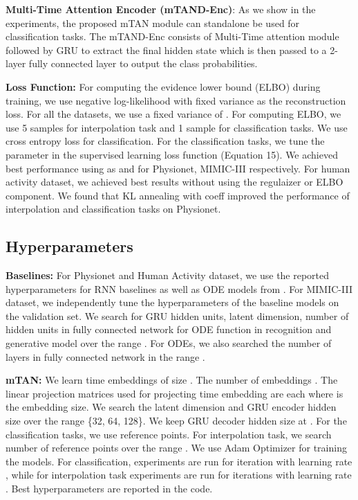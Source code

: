 \documentclass{article} \usepackage{iclr2021_conference,times}
\begin{document}
{\bf Multi-Time Attention Encoder (mTAND-Enc)}: As we show in the experiments, the proposed mTAN module can standalone be used for classification tasks. The mTAND-Enc consists of Multi-Time attention module followed by GRU to extract the final hidden state which is then passed to a 2-layer fully connected layer to output the class probabilities.   

{\bf Loss Function:} For computing the evidence lower bound (ELBO) during training, we use negative log-likelihood with fixed variance as the reconstruction loss. For all the datasets, we use a fixed variance of . For computing ELBO, we use 5 samples for interpolation task and 1 sample for classification tasks. We use cross entropy loss for classification. For the classification tasks, we tune the  parameter in the supervised learning loss function (Equation 15). We achieved best performance using  as   and  for Physionet, MIMIC-III respectively. For human activity dataset, we achieved best results without using the regulaizer or ELBO component.  We found that KL annealing with coeff  improved the performance of interpolation and classification tasks on Physionet.

\subsection{Hyperparameters}
\label{sec:hyperparamters}
{\bf Baselines:} For Physionet and Human Activity dataset, we use the reported hyperparameters for RNN baselines as well as ODE models from \citet{Rubanova2019}. For MIMIC-III dataset, we independently tune the hyperparameters of the baseline models on the validation set. We search for GRU hidden units, latent dimension, number of hidden units in fully connected network for ODE function in recognition and generative model over the range . For ODEs, we also searched the number of layers in fully connected network in the range . 

{\bf mTAN:} We learn time embeddings of size . The number of embeddings . The linear projection matrices used for projecting time embedding  are each   where  is the embedding size. We search the latent dimension and GRU encoder hidden size over the range \{32, 64, 128\}. We keep GRU decoder hidden size at . For the classification tasks, we use  reference points. For interpolation task, we search number of reference points over the range . We use Adam Optimizer for training the models. For classification, experiments are run for  iteration with learning rate , while for interpolation task experiments are run for  iterations with learning rate . Best hyperparameters are reported in the code.
\end{document}
